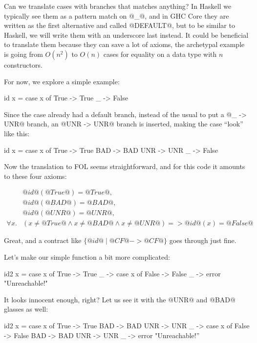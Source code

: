 
Can we translate cases with branches that matches anything?  In
Haskell we typically see them as a pattern match on @_@, and in GHC
Core they are written as the first alternative and called @DEFAULT@,
but to be similar to Haskell, we will write them with an underscore
last instead. It could be beneficial to translate them because they
can save a lot of axioms, the archetypal example is going from
$O(n^2)$ to $O(n)$ cases for equality on a data type with $n$
constructors.

For now, we explore a simple example:

\begin{code}
    id x = case x of
        True -> True
        _    -> False
\end{code}

Since the case already had a default branch, instead of the usual to
put a @_ -> UNR@ branch, an @UNR -> UNR@ branch is inserted, making
the case ``look'' like this:

\begin{code}
    id x = case x of
        True -> True
        BAD  -> BAD
        UNR  -> UNR
        _    -> False
\end{code}

Now the translation to FOL seems straightforward, and for this code
it amounts to these four axioms:

\[\begin{array}{rl}
 & @id@(@True@) = @True@, \\
 & @id@(@BAD@) = @BAD@, \\
 & @id@(@UNR@) = @UNR@, \\
\forall x . &
    (x \neq @True@ \land
     x \neq @BAD@ \land
     x \neq @UNR@) =>  @id@(x) = @False@
\end{array}\]

Great, and a contract like $\{ @id@ \mid @CF@ -> @CF@ \}$ goes through
just fine.

Let's make our simple function a bit more complicated:

\begin{code}
    id2 x = case x of
        True -> True
        _    -> case x of
            False -> False
            _     -> error "Unreachable!"
\end{code}

It looks innocent enough, right? Let us see it with the @UNR@ and
@BAD@ glasses as well:

\begin{code}
    id2 x = case x of
        True -> True
        BAD  -> BAD
        UNR  -> UNR
        _    -> case x of
            False -> False
            BAD  -> BAD
            UNR  -> UNR
            _     -> error "Unreachable!''
\end{code}

